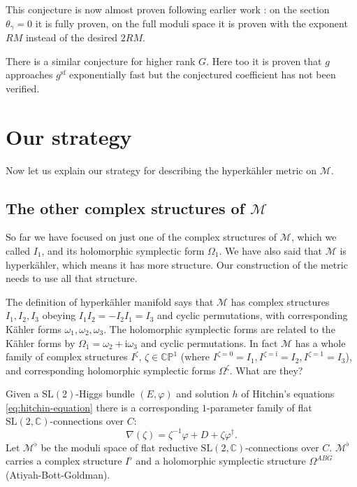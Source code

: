 \documentclass[12pt,letterpaper,reqno]{article}
\numberwithin{equation}{section}
\newcommand{\cM}{\ensuremath{\mathcal M}}
\newcommand{\bbC}{\ensuremath{\mathbb C}}
\newcommand{\bbP}{\ensuremath{\mathbb P}}
\newcommand{\kahler}{K\"ahler\xspace}
\newcommand{\hk}{hyperk\"ahler\xspace}
\newcommand{\I}{{\mathrm i}}
\renewcommand{\sf}{\mathrm{sf}}
\newcommand{\SL}{\mathrm{SL}}
\begin{document}
This conjecture is now almost proven
\cite{mochizuki2024comparison} following earlier 
work \cite{mazzeo2019asymptotic,dumas2019asymptotics,fredrickson2020exponential}: on
the section $\theta_\gamma = 0$
it is fully proven, on the full moduli space
it is proven with the exponent $RM$ instead
of the desired $2RM$.

There is a similar conjecture for higher rank
$G$. Here too it is proven that $g$ approaches
$g^\sf$ exponentially fast
\cite{fredrickson2020exponential} but the conjectured coefficient has not been verified.


\section{Our strategy}

Now let us explain our strategy for describing the \hk metric on $\cM$.

\subsection{The other complex structures of \texorpdfstring{$\cM$}{M}}

So far we have focused on just one of the complex
structures of $\cM$, which we called $I_1$,
and its holomorphic symplectic form $\Omega_1$.
We have also said that $\cM$ is \hk, which means it has more structure.
Our construction of the metric needs to use all that structure.

The definition of \hk manifold says that 
$\cM$ has complex structures $I_1, I_2, I_3$ obeying
$I_1 I_2 = -I_2 I_1 = I_3$ and cyclic permutations,
with corresponding \kahler forms $\omega_1, \omega_2, \omega_3$.
The holomorphic symplectic forms are related to the
\kahler forms by $\Omega_1 = \omega_2 + \I \omega_3$ 
and cyclic permutations.
In fact $\cM$ has a whole family of complex structures 
$I^\zeta$, $\zeta \in \bbC\bbP^1$ (where
$I^{\zeta=0} = I_1, I^{\zeta = \I} = I_2, I^{\zeta = 1} = I_3$),
and corresponding holomorphic symplectic forms $\Omega^\zeta$.
What are they?

Given a $\SL(2)$-Higgs bundle $(E,\varphi)$ and 
solution $h$ of Hitchin's equations \eqref{eq:hitchin-equation}
there is a corresponding $1$-parameter family of flat
$\SL(2,\bbC)$-connections over $C$:
\begin{equation}
  \nabla(\zeta) = \zeta^{-1} \varphi + D + \zeta \varphi^\dagger.
\end{equation}
Let $\cM^\flat$
be the moduli space of flat reductive 
$\SL(2,\bbC)$-connections over $C$. 
$\cM^\flat$ carries a complex structure $I^\flat$
and a holomorphic symplectic
structure $\Omega^{ABG}$ (Atiyah-Bott-Goldman).
\end{document}
